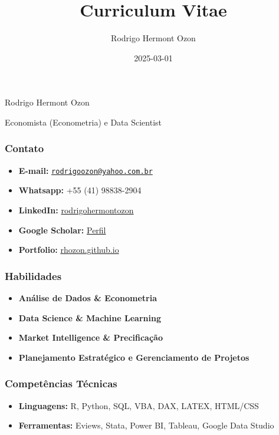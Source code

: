 \documentclass[
  letterpaper,
  DIV=11,
  numbers=noendperiod]{scrartcl}
\title{Curriculum Vitae}
\author{Rodrigo Hermont Ozon}
\date{2025-03-01}
\providecommand{\tightlist}{%
  \setlength{\itemsep}{0pt}\setlength{\parskip}{0pt}}\usepackage{longtable,booktabs,array}
\begin{document}
\maketitle


Rodrigo Hermont Ozon

Economista (Econometria) e Data Scientist

\subsubsection{Contato}\label{contato}

\begin{itemize}
\tightlist
\item
  \textbf{E-mail:}
  \href{mailto:rodrigoozon@yahoo.com.br}{\nolinkurl{rodrigoozon@yahoo.com.br}}
\item
  \textbf{Whatsapp:} +55 (41) 98838-2904
\item
  \textbf{LinkedIn:}
  \href{https://www.linkedin.com/in/rodrigohermontozon/}{rodrigohermontozon}
\item
  \textbf{Google Scholar:}
  \href{https://scholar.google.com/citations?hl=en&user=hPcIR9oAAAAJ}{Perfil}
\item
  \textbf{Portfolio:} \href{https://rhozon.github.io/}{rhozon.github.io}
\end{itemize}

\subsubsection{Habilidades}\label{habilidades}

\begin{itemize}
\tightlist
\item
  \textbf{Análise de Dados \& Econometria}
\item
  \textbf{Data Science \& Machine Learning}
\item
  \textbf{Market Intelligence \& Precificação}
\item
  \textbf{Planejamento Estratégico e Gerenciamento de Projetos}
\end{itemize}

\subsubsection{Competências Técnicas}\label{competuxeancias-tuxe9cnicas}

\begin{itemize}
\tightlist
\item
  \textbf{Linguagens:} R, Python, SQL, VBA, DAX, LATEX, HTML/CSS
\item
  \textbf{Ferramentas:} Eviews, Stata, Power BI, Tableau, Google Data
  Studio
\end{itemize}
\end{document}
